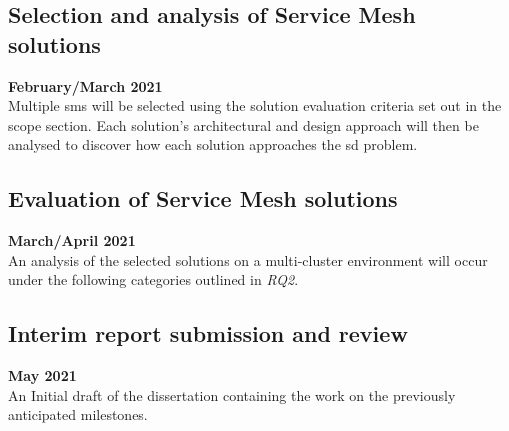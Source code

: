 \documentclass[12pt, a4paper, oneside]{article}
\begin{document}
\subsection{Selection and analysis of Service Mesh solutions}
\textbf{February/March 2021}\\
Multiple \acrshort{sm}s will be selected using the solution evaluation criteria set out in the scope section. Each solution’s architectural and design approach will then be analysed to discover how each solution approaches the \acrshort{sd} problem.

\subsection{Evaluation of Service Mesh solutions}
\textbf{March/April 2021}\\
An analysis of the selected solutions on a multi-cluster environment will occur under the following categories outlined in \textit{RQ2}.

\subsection{Interim report submission and review}
\textbf{May 2021}\\
An Initial draft of the dissertation containing the work on the previously anticipated milestones. 
\newpage


\end{document}
